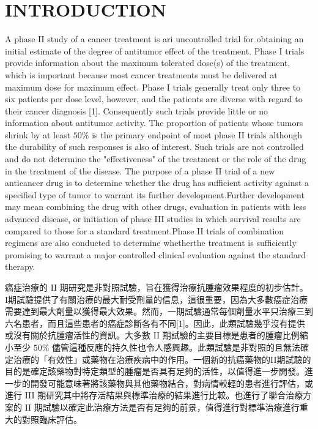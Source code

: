 \section{INTRODUCTION}
	A phase II study of a cancer treatment is ari uncontrolled trial for obtaining an initial estimate of the degree of antitumor effect of the treatment. Phase I trials provide information about the maximum tolerated dose(s) of the treatment, which is important because most cancer treatments must be delivered at maximum dose for maximum effect. Phase I trials generally treat only three to six patients per dose level, however, and the patients are diverse with regard to their cancer diagnosis [1]. Consequently such trials provide little or no information about antitumor activity. The proportion of patients whose tumors shrink by at least $50\%$ is the primary endpoint of most phase II trials although the durability of such responses is also of interest. Such trials are not controlled and do not determine the "effectiveness" of the treatment or the role of the drug in the treatment of the disease. The purpose of a phase II trial of a new anticancer drug is to determine whether the drug has sufficient activity against a specified type of tumor to warrant its further development.Further development may mean combining the drug with other drugs, evaluation in patients with less advanced disease, or initiation of phase III studies in which survival results are compared to those for a standard treatment.Phase II trials of combination regimens are also conducted to determine whetherthe treatment is sufficiently promising to warrant a major controlled clinical evaluation against the standard therapy. 

癌症治療的 II 期研究是非對照試驗，旨在獲得治療抗腫瘤效果程度的初步估計。 I期試驗提供了有關治療的最大耐受劑量的信息，這很重要，因為大多數癌症治療需要達到最大劑量以獲得最大效果。然而，一期試驗通常每個劑量水平只治療三到六名患者，而且這些患者的癌症診斷各有不同[1]。因此，此類試驗幾乎沒有提供或沒有關於抗腫瘤活性的資訊。大多數 II 期試驗的主要目標是患者的腫瘤比例縮小至少 $50\%$ 儘管這種反應的持久性也令人感興趣。此類試驗是非對照的且無法確定治療的「有效性」或藥物在治療疾病中的作用。一個新的抗癌藥物的II期試驗的目的是確定該藥物對特定類型的腫瘤是否具有足夠的活性，以值得進一步開發。進一步的開發可能意味著將該藥物與其他藥物結合，對病情較輕的患者進行評估，或進行 III 期研究其中將存活結果與標準治療的結果進行比較。也進行了聯合治療方案的 II 期試驗以確定此治療方法是否有足夠的前景，值得進行對標準治療進行重大的對照臨床評估。

